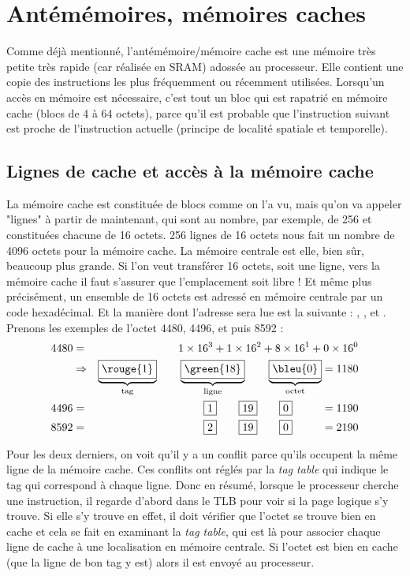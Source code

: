 \documentclass[12pt,a4paper]{report}
\begin{document}
\section{Antémémoires, mémoires caches}
Comme déjà mentionné, l'antémémoire/mémoire cache est une mémoire très petite très rapide (car réalisée en SRAM) adossée au processeur. Elle contient une copie des instructions les plus fréquemment ou récemment utilisées. Lorsqu'un accès en mémoire est nécessaire, c'est tout un bloc qui est rapatrié en mémoire cache (blocs de 4 à 64 octets), parce qu'il est probable que l'instruction suivant est proche de l'instruction actuelle (principe de localité spatiale et temporelle).
\subsection*{Lignes de cache et accès à la mémoire cache}
La mémoire cache est constituée de blocs comme on l'a vu, mais qu'on va appeler "lignes" à partir de maintenant, qui sont au nombre, par exemple, de 256 et constituées chacune de 16 octets. 256 lignes de 16 octets nous fait un nombre de 4096 octets pour la mémoire cache. La mémoire centrale est elle, bien sûr, beaucoup plus grande. Si l'on veut transférer 16 octets, soit une ligne, vers la mémoire cache il faut s'assurer que l'emplacement soit libre ! Et même plus précisément, un ensemble de 16 octets est adressé en mémoire centrale par un code hexadécimal. Et la manière dont l'adresse sera lue est la suivante : , , et . Prenons les exemples de l'octet 4480, 4496, et puis 8592 : 
\begin{eqnarray*}
4480 &=& 1\times 16^3 + 1\times 16^2 + 8\times 16^1 + 0\times 16^0 \\
&\Rightarrow& \underbrace{\boxed{\rouge{1}}}_{\text{tag}}\qquad \underbrace{\boxed{\green{18}}}_{\text{ligne}}  \qquad \underbrace{\boxed{\bleu{0}}}_{\text{octet}} = 1180 \\
4496 &=&  \boxed{1} \qquad \boxed{19} \qquad \boxed{0}  \qquad \ \ = 1190 \\
8592 &=&  \boxed{2} \qquad \boxed{19} \qquad \boxed{0} \qquad \ \ = 2190
\end{eqnarray*}

Pour les deux derniers, on voit qu'il y a un conflit parce qu'ils occupent la même ligne de la mémoire cache. Ces conflits ont réglés par la \textit{tag table} qui indique le tag qui correspond à chaque ligne. Donc en résumé, lorsque le processeur cherche une instruction, il regarde d'abord dans le TLB pour voir si la page logique s'y trouve. Si elle s'y trouve en effet, il doit vérifier que l'octet se trouve bien en cache et cela se fait en examinant la \textit{tag table}, qui est là pour associer chaque ligne de cache à une localisation en mémoire centrale. Si l'octet est bien en cache (que la ligne de bon tag y est) alors il est envoyé au processeur.
\end{document}
